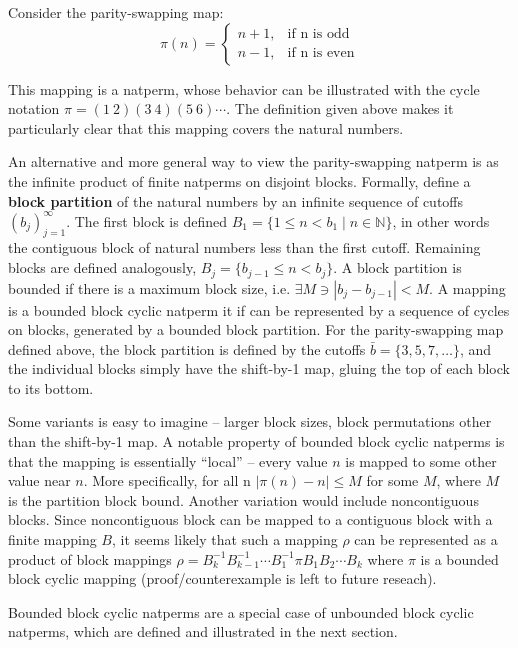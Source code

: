 \documentclass[12pt,reqno]{article}
\begin{document}
Consider the parity-swapping map:
\begin{equation}
    \pi(n) = \begin{cases}
        n + 1, & \text{if n is odd} \\
        n - 1, & \text{if n is even}
    \end{cases}
\end{equation}

This mapping is a natperm, whose behavior can be illustrated with the cycle notation $\pi = (1 \ 2)(3 \ 4)(5 \ 6)\cdots$. The definition given above makes it particularly clear that this mapping covers the natural numbers.

An alternative and more general way to view the parity-swapping natperm is as the infinite product of finite natperms on disjoint blocks. Formally, define a \textbf{block partition} of the natural numbers by an infinite sequence of cutoffs $({b_j})_{j=1}^{\infty}$. The first block is defined $B_1 = \{ 1 \leq n < b_1 \; | \; n \in \mathbb{N} \}$, in other words the contiguous block of natural numbers less than the first cutoff. Remaining blocks are defined analogously,  $B_j = \{ b_{j-1} \leq n < b_j \}$. A block partition is bounded if there is a maximum block size, i.e. $\exists M \ni |b_j - b_{j-1}| < M$. A mapping is a bounded block cyclic natperm it if can be represented by a sequence of cycles on blocks, generated by a bounded block partition. For the parity-swapping map defined above, the block partition is defined by the cutoffs $\bar{b} = \{ 3, 5, 7, \ldots \}$, and the individual blocks simply have the shift-by-1 map, gluing the top of each block to its bottom. 

Some variants is easy to imagine -- larger block sizes, block permutations other than the shift-by-1 map. A notable property of bounded block cyclic natperms is that the mapping is essentially ``local'' -- every value $n$ is mapped to some other value near $n$. More specifically,  for all n $|\pi(n) - n| \leq M$ for some $M$, where $M$ is the partition block bound. Another variation would include noncontiguous blocks. Since noncontiguous block can be mapped to a contiguous block with a finite mapping $B$, it seems likely that such a mapping $\rho$ can be represented as a product of block mappings $\rho = B_k^{-1} B_{k-1}^{-1} \cdots B_1^{-1} \pi B_1 B_2 \cdots B_k$ where $\pi$ is a bounded block cyclic mapping (proof/counterexample is left to future reseach).

Bounded block cyclic natperms are a special case of unbounded block cyclic natperms, which are defined and illustrated in the next section.
\end{document}
